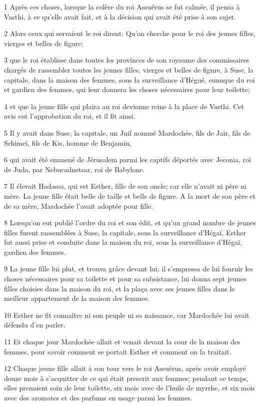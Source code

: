 \par 1 Après ces choses, lorsque la colère du roi Assuérus se fut calmée, il pensa à Vasthi, à ce qu'elle avait fait, et à la décision qui avait été prise à son sujet.
\par 2 Alors ceux qui servaient le roi dirent: Qu'on cherche pour le roi des jeunes filles, vierges et belles de figure;
\par 3 que le roi établisse dans toutes les provinces de son royaume des commissaires chargés de rassembler toutes les jeunes filles, vierges et belles de figure, à Suse, la capitale, dans la maison des femmes, sous la surveillance d'Hégué, eunuque du roi et gardien des femmes, qui leur donnera les choses nécessaires pour leur toilette;
\par 4 et que la jeune fille qui plaira au roi devienne reine à la place de Vasthi. Cet avis eut l'approbation du roi, et il fit ainsi.
\par 5 Il y avait dans Suse, la capitale, un Juif nommé Mardochée, fils de Jaïr, fils de Schimeï, fils de Kis, homme de Benjamin,
\par 6 qui avait été emmené de Jérusalem parmi les captifs déportés avec Jeconia, roi de Juda, par Nebucadnetsar, roi de Babylone.
\par 7 Il élevait Hadassa, qui est Esther, fille de son oncle; car elle n'avait ni père ni mère. La jeune fille était belle de taille et belle de figure. A la mort de son père et de sa mère, Mardochée l'avait adoptée pour fille.
\par 8 Lorsqu'on eut publié l'ordre du roi et son édit, et qu'un grand nombre de jeunes filles furent rassemblées à Suse, la capitale, sous la surveillance d'Hégaï, Esther fut aussi prise et conduite dans la maison du roi, sous la surveillance d'Hégaï, gardien des femmes.
\par 9 La jeune fille lui plut, et trouva grâce devant lui; il s'empressa de lui fournir les choses nécessaires pour sa toilette et pour sa subsistance, lui donna sept jeunes filles choisies dans la maison du roi, et la plaça avec ses jeunes filles dans le meilleur appartement de la maison des femmes.
\par 10 Esther ne fit connaître ni son peuple ni sa naissance, car Mardochée lui avait défendu d'en parler.
\par 11 Et chaque jour Mardochée allait et venait devant la cour de la maison des femmes, pour savoir comment se portait Esther et comment on la traitait.
\par 12 Chaque jeune fille allait à son tour vers le roi Assuérus, après avoir employé douze mois à s'acquitter de ce qui était prescrit aux femmes; pendant ce temps, elles prenaient soin de leur toilette, six mois avec de l'huile de myrrhe, et six mois avec des aromates et des parfums en usage parmi les femmes.
